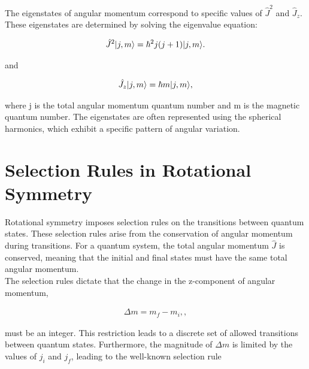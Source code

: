 \documentclass[a4paper,11pt]{article}
\DeclarePairedDelimiter\ket{\lvert}{\rangle}
\begin{document}
The eigenstates of angular momentum correspond to specific values of $\hat{J}^2$ and $\hat{J}_z$. These eigenstates are determined by solving the eigenvalue equation: 

\begin{equation}
\label{eq:EigenValues of J^2}
\begin{aligned}
\hat{J}^2 \ket{j,m} = \hbar^2j(j + 1) \ket{j, m}. 
\end{aligned}
\end{equation}

\begin{center}
   and
\end{center}
\begin{equation}
\label{eq:EigenValues of Jz}
\begin{aligned}
\hat{J_z}\ket{j,m} = \hbar m \ket{j, m},
\end{aligned}
\end{equation}


where j is the total angular momentum quantum number and m is the magnetic quantum number. The eigenstates are often represented using the spherical harmonics, which exhibit a specific pattern of angular variation.
\\




\section{Selection Rules in Rotational Symmetry}

Rotational symmetry imposes selection rules on the transitions between quantum states. These selection rules arise from the conservation of angular momentum during transitions. For a quantum system, the total angular momentum $\hat{J}$ is conserved, meaning that the initial and final states must have the same total angular momentum.
\\

The selection rules dictate that the change in the z-component of angular momentum,

\begin{equation}
\label{eq:Selection Rules on m}
\begin{aligned}
\Delta m = m_f - m_i,,
\end{aligned}
\end{equation}

must be an integer. This restriction leads to a discrete set of allowed transitions between quantum states. Furthermore, the magnitude of $\Delta m$ is limited by the values of $j_i$ and $j_f$, leading to the well-known selection rule 
\end{document}

